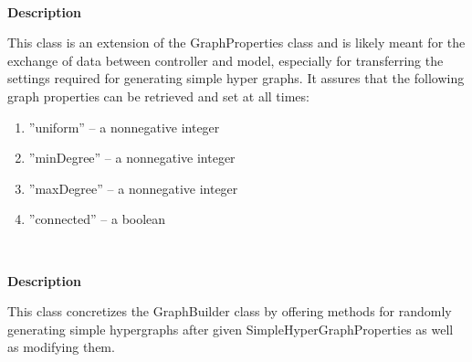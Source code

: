 	~\newpage
	
	
	\textbf{Description}
	
	This class is an extension of the GraphProperties class and is likely meant for the exchange of data between controller and model, especially for transferring the settings required for generating simple hyper graphs. It assures that the following graph properties can be retrieved and set at all times:
	
	\begin{enumerate}[--]
		\item{''uniform'' -- a nonnegative integer}
		\item{''minDegree'' -- a nonnegative integer}
		\item{''maxDegree'' -- a nonnegative integer}
		\item{''connected'' -- a boolean}
	\end{enumerate}
	
	~\newline
	~\newline
	~\newline
	
	
	\textbf{Description}
	
	This class concretizes the GraphBuilder class by offering methods for randomly generating simple hypergraphs after given SimpleHyperGraphProperties as well as modifying them.
	
